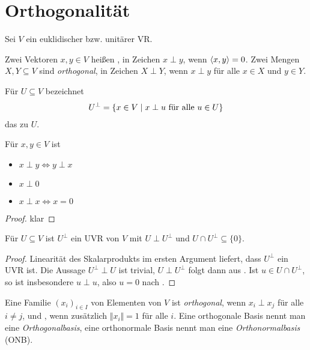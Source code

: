 \section{Orthogonalität}

Sei $V$ ein euklidischer bzw. unitärer VR.

\begin{definition}
	Zwei Vektoren $x,y\in V$ heißen , in Zeichen $x\perp y$, wenn $\left\langle x,y\right\rangle=0$. Zwei Mengen $X,Y\subseteq V$ sind \emph{orthogonal}, in Zeichen $X\perp Y$, wenn $x\perp y$ für alle $x\in X$ und $y\in Y$.
	
	Für $U\subseteq V$ bezeichnet 
	\begin{align}
		U^{\perp}=\{x\in V\mid x\perp u\text{ für alle } u\in U\}\notag
	\end{align}
	das  zu $U$.
\end{definition}

\begin{lemma}
	Für $x,y\in V$ ist
	\begin{itemize}
		\item $x\perp y\iff y\perp x$
		\item $x\perp 0$
		\item $x\perp x\iff x=0$
	\end{itemize}
\end{lemma}
\begin{proof}
	klar
\end{proof}

\begin{proposition}
	Für $U\subseteq V$ ist $U^\perp$ ein UVR von $V$ mit $U\perp U^\perp$ und $U\cap U^\perp \subseteq\{0\}$.
\end{proposition}
\begin{proof}
	Linearität des Skalarprodukts im ersten Argument liefert, dass $U^\perp$ ein UVR ist. Die Aussage $U^\perp \perp U$ ist trivial, $U \perp U^\perp$ folgt dann aus . Ist $u\in U\cap U^\perp$, so ist insbesondere $u\perp u$, also $u=0$ nach .
\end{proof}

\begin{definition}[orthonormal]
	Eine Familie $(x_i)_{i\in I}$ von Elementen von $V$ ist \emph{orthogonal}, wenn $x_i\perp x_j$ für alle $i\neq j$, und , wenn zusätzlich $\Vert x_i\Vert=1$ für alle $i$. Eine orthogonale Basis nennt man eine \emph{Orthogonalbasis}, eine orthonormale Basis nennt man eine \emph{Orthonormalbasis} (ONB).
\end{definition}

